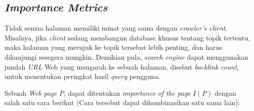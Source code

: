 \subsection{\emph{Importance Metrics}}

Tidak semua halaman memiliki minat yang sama dengan \emph{crawler's client}. Misalnya, jika \emph{client} sedang membangun database khusus tentang topik tertentu, maka halaman yang merujuk ke topik tersebut lebih penting, dan harus dikunjungi sesegera mungkin. Demikian pula, \emph{search engine} dapat menggunakan jumlah \emph{URL} Web yang mengarah ke sebuah halaman, disebut \emph{backlink count}, untuk menentukan peringkat hasil \emph{query} pengguna.

Sebuah \emph{Web page} $P$, dapat ditentukan \emph{importance of the page} $I(P)$ dengan salah satu cara berikut (Cara tersebut dapat dikombinasikan satu sama lain):

